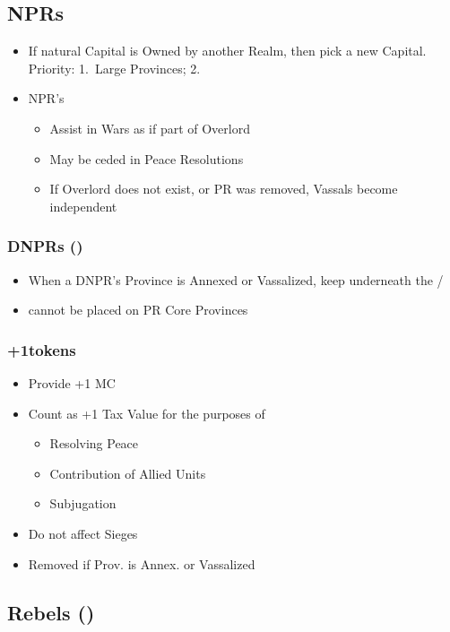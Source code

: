 \documentclass[10pt]{article}
\begin{document}
\subsection*{NPRs }
\begin{itemize}
	\item If natural Capital is Owned by another Realm, then pick a new Capital. Priority: 1.~Large Provinces; 2.~\az
	\item NPR's 
	\begin{itemize}
		\item Assist in Wars as if part of Overlord
		\item May be ceded in Peace Resolutions
		\item If Overlord does not exist, or PR \vassal was removed, Vassals become independent
	\end{itemize}
\end{itemize}

\subsubsection*{DNPRs (\dnpr)}
\begin{itemize}
	\item When a DNPR's Province is Annexed or Vassalized, keep \dnpr underneath the \town/\vassal 
	\item \dnpr cannot be placed on PR Core Provinces
\end{itemize}

\subsubsection*{+1\manpower tokens}
\begin{itemize}
	\item Provide +1 MC
	\item Count as +1 Tax Value for the purposes of 
	\begin{itemize}
		\item Resolving Peace
		\item Contribution of Allied Units
		\item Subjugation
	\end{itemize}
	\item Do not affect Sieges
	\item Removed if Prov. is Annex. or Vassalized
\end{itemize}

\subsection*{Rebels (\rebel) }
\end{document}
